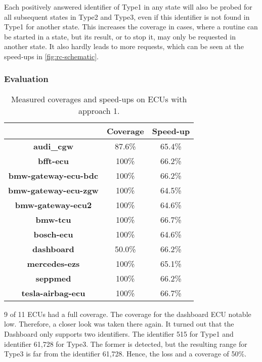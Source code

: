 Each positively answered identifier of Type1 in any state will also be probed for all subsequent states in Type2 and Type3, even if this identifier is not found in Type1 for another state. This increases the coverage in cases, where a routine can be started in a state, but its result, or to stop it, may only be requested in another state. It also hardly leads to more requests, which can be seen at the speed-ups in \autoref{fig:rc-schematic}.

\subsubsection{Evaluation}

\begin{table}[h]
    \begin{center}
    \begin{tabular}{ccc}
        \hline
        & \textbf{Coverage} & \textbf{Speed-up} \\
        \hline
        \textbf{audi\_cgw} & 87.6\% & 65.4\% \\
        \textbf{bfft-ecu} & 100\% & 66.2\% \\
        \textbf{bmw-gateway-ecu-bdc} & 100\% & 66.2\% \\
        \textbf{bmw-gateway-ecu-zgw} & 100\% & 64.5\% \\
        \textbf{bmw-gateway-ecu2} & 100\% & 64.6\% \\
        \textbf{bmw-tcu} & 100\% & 66.7\% \\
        \textbf{bosch-ecu} & 100\% & 64.6\% \\
        \textbf{dashboard} & 50.0\% & 66.2\% \\
        \textbf{mercedes-ezs} & 100\% & 65.1\% \\
        \textbf{seppmed} & 100\% & 66.2\% \\
        \textbf{tesla-airbag-ecu} & 100\% & 66.7\% \\
        \hline

    \end{tabular}
    \end{center}
    \caption{Measured coverages and speed-ups on ECUs with approach 1.}
    \label{tab:evaluation-approach1}
\end{table}

9 of 11 ECUs had a full coverage. The coverage for the dashboard ECU notable low. Therefore, a closer look was taken there again. It turned out that the Dashboard only supports two identifiers. The identifier 515 for Type1 and identifier 61,728 for Type3. The former is detected, but the resulting range for Type3 is far from the identifier 61,728. Hence, the loss and a coverage of 50\%.

